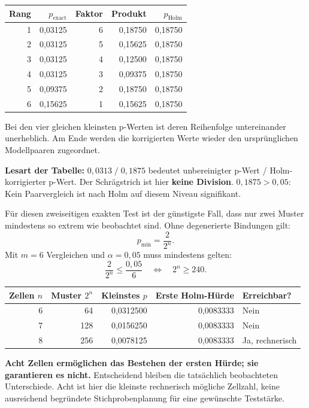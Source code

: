 \begin{center}\small\begin{tabular}{rrrrr}\toprule
Rang & $p_{\mathrm{exact}}$ & Faktor & Produkt & $p_{\mathrm{Holm}}$\\\midrule
1 & 0,03125 & 6 & 0,18750 & 0,18750\\
2 & 0,03125 & 5 & 0,15625 & 0,18750\\
3 & 0,03125 & 4 & 0,12500 & 0,18750\\
4 & 0,03125 & 3 & 0,09375 & 0,18750\\
5 & 0,09375 & 2 & 0,18750 & 0,18750\\
6 & 0,15625 & 1 & 0,15625 & 0,18750\\\bottomrule
\end{tabular}\end{center}
Bei den vier gleichen kleinsten p-Werten ist deren Reihenfolge untereinander unerheblich. Am Ende werden die korrigierten Werte wieder den ursprünglichen Modellpaaren zugeordnet.

\textbf{Lesart der Tabelle:} $0{,}0313\;/\;0{,}1875$ bedeutet unbereinigter p-Wert / Holm-korrigierter p-Wert. Der Schrägstrich ist hier \textbf{keine Division}. $0{,}1875>0{,}05$: Kein Paarvergleich ist nach Holm auf diesem Niveau signifikant.

Für diesen zweiseitigen exakten Test ist der günstigste Fall, dass nur zwei Muster mindestens so extrem wie beobachtet sind. Ohne degenerierte Bindungen gilt:
\[
p_{\min}=\frac2{2^n}.
\]
Mit $m=6$ Vergleichen und $\alpha=0{,}05$ muss mindestens gelten:
\[
\frac2{2^n}\leq\frac{0{,}05}{6}
\quad\Longleftrightarrow\quad
2^n\geq240.
\]
\begin{center}\begin{tabular}{rrrrl}\toprule
Zellen $n$ & Muster $2^n$ & Kleinstes $p$ & Erste Holm-Hürde & Erreichbar?\\\midrule
6 & 64 & 0,0312500 & 0,0083333 & Nein\\
7 & 128 & 0,0156250 & 0,0083333 & Nein\\
8 & 256 & 0,0078125 & 0,0083333 & Ja, rechnerisch\\\bottomrule
\end{tabular}\end{center}
\textbf{Acht Zellen ermöglichen das Bestehen der ersten Hürde; sie garantieren es nicht.} Entscheidend bleiben die tatsächlich beobachteten Unterschiede. Acht ist hier die kleinste rechnerisch mögliche Zellzahl, keine ausreichend begründete Stichprobenplanung für eine gewünschte Teststärke.

